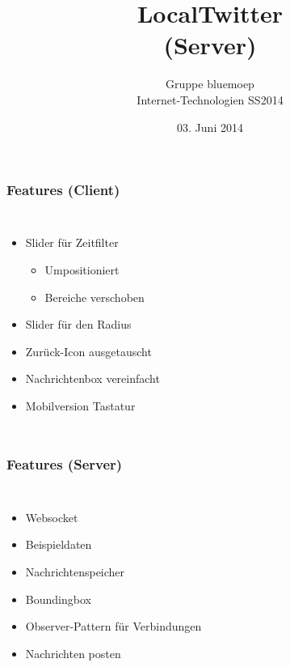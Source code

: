 \documentclass[aspectratio=43]{beamer}
\title{LocalTwitter\\(Server)}
\author{Gruppe bluemoep\\Internet-Technologien SS2014}
\date{03. Juni 2014}
\begin{document}
\frame{\maketitle}
 
\begin{frame}
	\frametitle{Features (Client)}
	\begin{columns}
		\column[t]{\textwidth}
			\begin{itemize}
			\item Slider für Zeitfilter
			\begin{itemize}
				\item Umpositioniert
				\item Bereiche verschoben
			\end{itemize}
			\item Slider für den Radius
			\item Zurück-Icon ausgetauscht
			\item Nachrichtenbox vereinfacht
			\item Mobilversion Tastatur
			\end{itemize}
	\end{columns}
\end{frame}

\begin{frame}
	\frametitle{Features (Server)}
	\begin{columns}
		\column[t]{\textwidth}
			\begin{itemize}
			\item Websocket
			\item Beispieldaten
			\item Nachrichtenspeicher
			\item Boundingbox
			\item Observer-Pattern für Verbindungen
			\item Nachrichten posten
			\end{itemize}
	\end{columns}
\end{frame}

\end{document}

